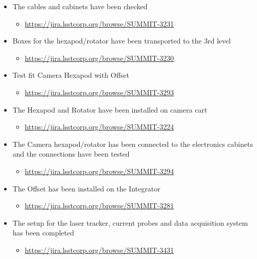 \documentclass[SE,lsstdraft,STR,toc]{lsstdoc}
\providecommand{\tightlist}{
  \setlength{\itemsep}{0pt}\setlength{\parskip}{0pt}}
\begin{document}
\begin{itemize}
\tightlist
\item
  The cables and cabinets have been checked~

  \begin{itemize}
  \tightlist
  \item
    \url{https://jira.lsstcorp.org/browse/SUMMIT-3231}
  \end{itemize}
\item
  Boxes for the hexapod/rotator have been transported to the 3rd level

  \begin{itemize}
  \tightlist
  \item
    \url{https://jira.lsstcorp.org/browse/SUMMIT-3230}
  \end{itemize}
\item
  Test fit Camera Hexapod with Offset

  \begin{itemize}
  \tightlist
  \item
    \url{https://jira.lsstcorp.org/browse/SUMMIT-3293}
  \end{itemize}
\item
  The Hexapod and Rotator have been installed on camera cart

  \begin{itemize}
  \tightlist
  \item
    \url{https://jira.lsstcorp.org/browse/SUMMIT-3224}
  \end{itemize}
\item
  The Camera hexapod/rotator has been connected to the electronics
  cabinets and the connections have been tested

  \begin{itemize}
  \tightlist
  \item
    \url{https://jira.lsstcorp.org/browse/SUMMIT-3294}
  \end{itemize}
\item
  The Offset has been installed on the Integrator

  \begin{itemize}
  \tightlist
  \item
    \url{https://jira.lsstcorp.org/browse/SUMMIT-3281}
  \end{itemize}
\item
  The setup for the laser tracker, current probes and data acquisition
  system has been completed

  \begin{itemize}
  \tightlist
  \item
    \url{https://jira.lsstcorp.org/browse/SUMMIT-3431}
  \end{itemize}
\end{itemize}
\end{document}
